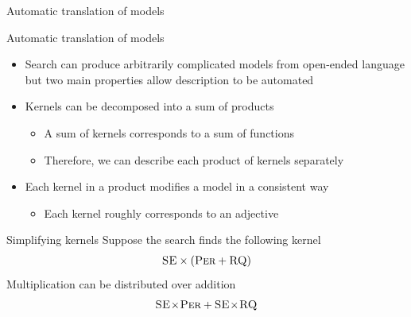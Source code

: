 \begin{frame}{Automatic translation of models}
  
\end{frame}

\begin{frame}{Automatic translation of models}
  \begin{itemize}
    \item Search can produce arbitrarily complicated models from open-ended language but two main properties allow description to be automated
    \vspace{\baselineskip}
    \item Kernels can be decomposed into a sum of products
    \begin{itemize}
      \item A sum of kernels corresponds to a sum of functions
      \item Therefore, we can describe each product of kernels separately
    \end{itemize}
    \vspace{\baselineskip}
    \item Each kernel in a product modifies a model in a consistent way
    \begin{itemize}
      \item Each kernel roughly corresponds to an adjective
    \end{itemize}
  \end{itemize}
\end{frame}

\begin{frame}{Simplifying kernels}
  Suppose the search finds the following kernel
  \begin{align*}
    {\textsc{SE}} \times ( {\textsc{Per}} + {\textsc{RQ}})
  \end{align*}
  Multiplication can be distributed over addition
  \begin{align*}
    {\textsc{SE}} \! \times \! {\textsc{Per}} +     {\textsc{SE}} \! \times \! {\textsc{RQ}}
  \end{align*}
\end{frame}

